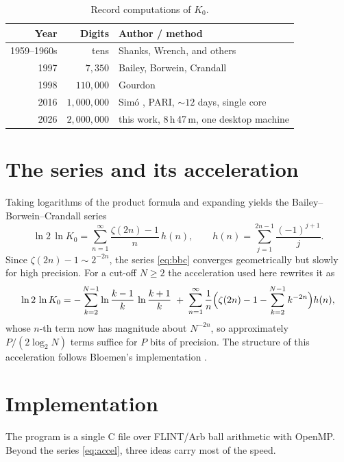 \documentclass[11pt]{amsart}
\newcommand{\Kzero}{K_0}
\begin{document}
\begin{table}[ht]
\caption{Record computations of $\Kzero$.}
\label{tab:records}
\begin{tabular}{rrl}
\toprule
Year & Digits & Author / method \\
\midrule
1959--1960s & tens & Shanks, Wrench, and others \\
1997 & $7{,}350$ & Bailey, Borwein, Crandall \cite{bbc1997} \\
1998 & $110{,}000$ & Gourdon \cite{gourdon} \\
2016 & $1{,}000{,}000$ & Sim\'o \cite{simo2016}, PARI, ${\sim}12$ days, single core \\
2026 & $2{,}000{,}000$ & this work, 8\,h\,47\,m, one desktop machine \\
\bottomrule
\end{tabular}
\end{table}

\section{The series and its acceleration}

Taking logarithms of the product formula and expanding yields the
Bailey--Borwein--Crandall series \cite{bbc1997}
\begin{equation}
\label{eq:bbc}
\ln 2 \, \ln \Kzero
= \sum_{n=1}^{\infty} \frac{\zeta(2n) - 1}{n}\, h(n),
\qquad
h(n) = \sum_{j=1}^{2n-1} \frac{(-1)^{j+1}}{j}.
\end{equation}
Since $\zeta(2n) - 1 \sim 2^{-2n}$, the series
\eqref{eq:bbc} converges geometrically but slowly for high precision.
For a cut-off $N \ge 2$ the acceleration used here rewrites it as
\begin{equation}
\label{eq:accel}
\ln 2 \, \ln \Kzero
= -\sum_{k=2}^{N-1} \ln\frac{k-1}{k}\,\ln\frac{k+1}{k}
\;+\;
\sum_{n=1}^{\infty}
\frac{1}{n}\Bigl(\zeta(2n) - 1 - \sum_{k=2}^{N-1} k^{-2n}\Bigr) h(n),
\end{equation}
whose $n$-th term now has magnitude about $N^{-2n}$, so approximately
$P / (2\log_2 N)$ terms suffice for $P$ bits of precision. The
structure of this acceleration follows Bloemen's implementation
\cite{bloemen2022}.

\section{Implementation}

The program is a single C file over FLINT/Arb ball arithmetic
\cite{johansson2017} with OpenMP. Beyond the series
\eqref{eq:accel}, three ideas carry most of the speed.
\end{document}
